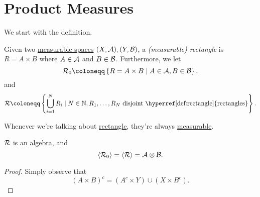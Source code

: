 \section{Product Measures}
We start with the definition.
\begin{definition}[Rectangle]\label{def:rectangle}
	Given two \hyperref[def:measurable-space]{measurable spaces} \((X, \mathcal{\MakeUppercase{a}} ), (Y, \mathcal{\MakeUppercase{b}} )\),
	a \emph{(measurable) rectangle} is \(R = A\times B\) where \(A\in \mathcal{\MakeUppercase{a}} \)
	and \(B\in \mathcal{\MakeUppercase{b}} \). Furthermore, we let
	\[
		\mathcal{\MakeUppercase{r}} _0 \coloneqq \left\{R = A\times B \mid A\in \mathcal{\MakeUppercase{a}} , B\in \mathcal{\MakeUppercase{b}} \right\},
	\]
	and
	\[
		\mathcal{\MakeUppercase{r}} \coloneqq \left\{\bigcup\limits_{i=1}^{N} R_{i} \mid N\in \mathbb{\MakeUppercase{n}} , R_1, \ldots , R_N \text{ disjoint \hyperref[def:rectangle]{rectangles}}\right\}.
	\]
\end{definition}
\begin{note}
	Whenever we're talking about \hyperref[def:rectangle]{rectangle}, they're always \hyperref[def:measurable-set]{measurable}.
\end{note}

\begin{lemma}
	\(\mathcal{\MakeUppercase{r}} \) is an \hyperref[def:algebra]{algebra}, and
	\[
		\left< \mathcal{\MakeUppercase{r}} _0 \right> = \left< \mathcal{\MakeUppercase{r}}  \right> = \mathcal{\MakeUppercase{a}} \otimes \mathcal{\MakeUppercase{b}}.
	\]
\end{lemma}
\begin{proof}
	Simply observe that
	\[
		(A\times B)^{c} = (A^{c} \times Y)\cup (X\times B^{c} ).
	\]
\end{proof}